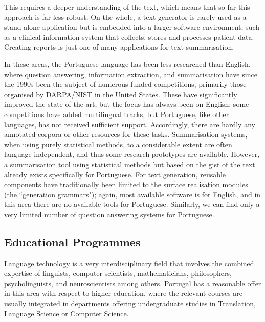 \begin{multicols}{2}

This requires a deeper understanding of the text, which means that so far this approach is far less robust. On the whole, a text generator is rarely used as a stand-alone application but is embedded into a larger software environment, such as a clinical information system that collects, stores and processes patient data. Creating reports is just one of many applications for text summarisation. 

In these areas, the Portuguese language has been less researched than English, where question answering, information extraction, and summarisation have since the 1990s been the subject of numerous funded competitions, primarily those organised by DARPA/NIST in the United States. These have significantly improved the state of the art, but the focus has always been on English; some competitions have added multilingual tracks, but Portuguese, like other languages, has not received sufficient support. Accordingly, there are hardly any annotated corpora or other resources for these tasks. Summarisation systems, when using purely statistical methods, to a considerable extent are often language independent, and thus some research prototypes are available. However, a summarisation tool using statistical methods but based on the gist of the text already exists specifically for Portuguese. For text generation, reusable components have traditionally been limited to the surface realisation modules (the “generation grammars"); again, most available software is for English, and in this area there are no available tools for Portuguese. Similarly, we can find only a very limited number of question answering systems for Portuguese.

\subsection{Educational Programmes}

  Language technology is a very interdisciplinary field that involves the combined expertise of linguists, computer scientists, mathematicians, philosophers, psycholinguists, and neuroscientists among others. Portugal has a reasonable offer in this area with respect to higher education, where the relevant courses are usually integrated in departments offering undergraduate studies in Translation, Language Science or Computer Science.


\end{multicols}
